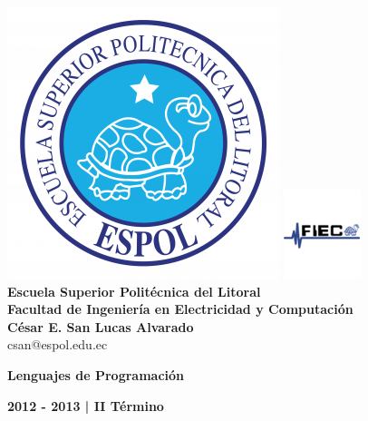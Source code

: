\documentclass[12pt]{article}
\begin{document}
{\centering
\includegraphics[scale=0.5]{imagenes_android/espol.png}
\hspace{0.9in}\includegraphics[scale=1.6]{imagenes_android/fiec.png}\\
\vspace{0.2in}
{\huge{\textbf{Escuela Superior Polit\'ecnica del Litoral\\\vspace{0.7in}Facultad de Ingenier\'ia en Electricidad y Computaci\'on}}}\\
\vspace{0.7in}
{\LARGE{\textbf{César E. San Lucas Alvarado}}}\\
\vspace{0.1in}
{\Large{csan@espol.edu.ec}}\\
\vspace{0.8in}
{\LARGE \textbf{{Lenguajes de Programaci\'on}}\\
\vspace{0.2in}
{\LARGE \textbf{{2012 - 2013 | II Término}}\\
\vspace{0.5in}

\newpage
\large
\tableofcontents

\newpage
\begin{flushleft}

\end{flushleft}}}}
\end{document}
